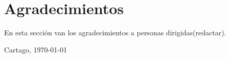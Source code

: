 \chapter*{Agradecimientos}
\thispagestyle{empty}

En esta sección van los agradecimientos a personas dirigidas(redactar).
\vspace*{1cm}

\scriptAuthor

Cartago, \today

\cleardoublepage

